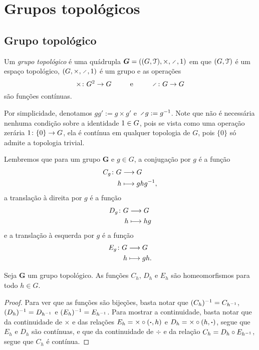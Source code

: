 \chapter{Grupos topológicos}

\section{Grupo topológico}

\begin{definition}
Um \emph{grupo topológico} é uma quádrupla $\bm G = ((G,\topo),\times,\div,\id)$ em que $(G,\mathcal{T})$ é um espaço topológico, $(G,\times,\div,\id)$ é um grupo e as operações
	\begin{equation*}
	\times\colon G^2 \to G \qquad\e\qquad \div\colon G \to G
	\end{equation*}
são funções contínuas.%
\end{definition}

Por simplicidade, denotamos $gg' := g \times g'$ e $\div g := g\inv$. Note que não é necessária nenhuma condição sobre a identidade $1 \in G$, pois se vista como uma operação zerária $1\colon \{0\} \to G$, ela é contínua em qualquer topologia de $G$, pois $\{0\}$ só admite a topologia trivial.

Lembremos que para um grupo $\bm G$ e $g \in G$, a conjugação por $g$ é a função
	\begin{align*}
	{C_g}\colon {G} &\longrightarrow {G} \\{h} &\longmapsto ghg^{-1},
	\end{align*}
a translação à direita por $g$ é a função
	\begin{align*}
	{D_g}\colon {G} &\longrightarrow {G} \\{h} &\longmapsto hg
	\end{align*}
e a translação à esquerda por $g$ é a função
	\begin{align*}
	{E_g}\colon {G} &\longrightarrow {G} \\{h} &\longmapsto gh.
	\end{align*}

\begin{proposition}
Seja $\bm G$ um grupo topológico. As funções $C_h$, $D_h$ e $E_h$ são homeomorfismos para todo $h \in G$.
\end{proposition}
\begin{proof}
Para ver que as funções são bijeções, basta notar que $(C_h)^{-1} = C_{h ^{-1}}$, $(D_h)^{-1} = D_{h ^{-1}}$ e $(E_h)^{-1} = E_{h ^{-1}}$. Para mostrar a continuidade, basta notar que da continuidade de $\times$ e das relações $E_h = \times \circ (\bm{\bm{\cdot}},h)$ e $D_h = \times \circ (h,\bm{\bm{\cdot}})$, segue que $E_h$ e $D_h$ são contínuas, e que da continuidade de $\div$ e da relação $C_h = D_h \circ E_{h^{-1}}$, segue que $C_h$ é contínua.
\end{proof}

